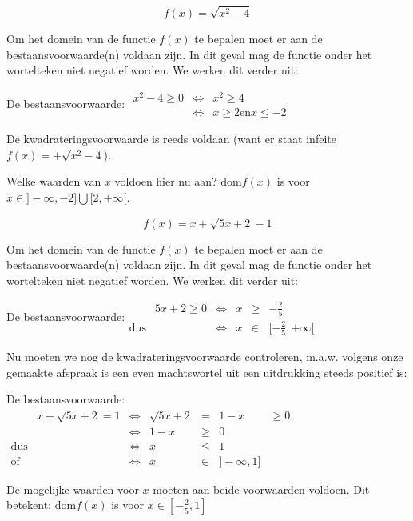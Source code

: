 \begin{voorbeeld}
	\begin{equation*}
f(x)=\sqrt{x^{2}-4}
\end{equation*}


Om het domein van de functie $f(x)$ te bepalen moet er aan de bestaansvoorwaarde(n)
voldaan zijn. In dit geval mag de functie onder het wortelteken niet
negatief worden. We werken dit verder uit:

De bestaansvoorwaarde: $\begin{array}{cccl}
x^{2}-4\geq0 &\iff & x^{2}\geq4\\
& \iff & x\geq2 \textrm{en} x\leq-2
\end{array}$

De kwadrateringsvoorwaarde is reeds voldaan (want er staat infeite
$f(x)=+\sqrt{x^{2}-4}$).

Welke waarden van $x$ voldoen hier nu aan? $\textrm{dom}f(x)$ is voor $x\in]-\infty,-2]\bigcup[2,+\infty[$.

\end{voorbeeld}

\begin{voorbeeld}
\begin{equation*}
f(x)=x+\sqrt{5x+2}-1
\end{equation*}


Om het domein van de functie $f(x)$ te bepalen moet er aan de bestaansvoorwaarde(n)
voldaan zijn. In dit geval mag de functie onder het wortelteken niet
negatief worden. We werken dit verder uit:

De bestaansvoorwaarde:$\begin{array}{cclccc}
 & 5x+2\geq0
 & \iff & x & \geq & -\frac{2}{5}\\
\textrm{dus} & & \iff & x & \in & [-\frac{2}{5},+\infty[
\end{array}$

Nu moeten we nog de kwadrateringsvoorwaarde controleren, m.a.w. volgens
onze gemaakte afspraak is een even machtswortel uit een uitdrukking
steeds positief is:

De bestaansvoorwaarde:
$\begin{array}{cccclcc}
 & x+\sqrt{5x+2}=1 & \iff & \sqrt{5x+2} & = & 1-x & \geq0\\
 & & \iff & 1-x & \geq & 0\\
\textrm{dus} & & \iff & x & \leq & 1\\
\textrm{of} & & \iff & x & \in & ]-\infty,1]
\end{array}$

De mogelijke waarden voor $x$ moeten aan beide voorwaarden voldoen.
Dit betekent: $\textrm{dom}f(x)$ is voor $x\in[-\frac{2}{5},1]$

\end{voorbeeld}

